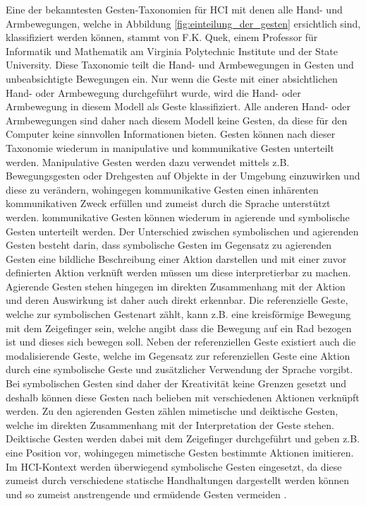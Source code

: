 Eine der bekanntesten Gesten-Taxonomien für HCI mit denen alle Hand- und Armbewegungen, welche in Abbildung \ref{fig:einteilung_der_gesten} ersichtlich sind, klassifiziert werden können, stammt von F.K. Quek, einem  Professor für Informatik und Mathematik am Virginia Polytechnic Institute und der State University. Diese Taxonomie teilt die Hand- und Armbewegungen in Gesten und unbeabsichtigte Bewegungen ein. Nur wenn die Geste mit einer absichtlichen Hand- oder Armbewegung durchgeführt wurde, wird die Hand- oder Armbewegung in diesem Modell als Geste klassifiziert. Alle anderen Hand- oder Armbewegungen sind daher nach diesem Modell keine Gesten, da diese für den Computer keine sinnvollen Informationen bieten. Gesten können nach dieser Taxonomie wiederum in manipulative und kommunikative Gesten unterteilt werden. Manipulative Gesten werden dazu verwendet mittels z.B. Bewegungsgesten oder Drehgesten auf Objekte in der Umgebung einzuwirken und diese zu verändern, wohingegen kommunikative Gesten einen inhärenten kommunikativen Zweck erfüllen und zumeist durch die Sprache unterstützt werden. kommunikative Gesten können wiederum in agierende und symbolische Gesten unterteilt werden. Der Unterschied zwischen symbolischen und agierenden Gesten besteht darin, dass symbolische Gesten im Gegensatz zu agierenden Gesten eine bildliche Beschreibung einer Aktion darstellen und mit einer zuvor definierten Aktion verknüft werden müssen um diese interpretierbar zu machen. Agierende Gesten stehen hingegen im direkten Zusammenhang mit der Aktion und deren Auswirkung ist daher auch direkt erkennbar. Die referenzielle Geste, welche zur symbolischen Gestenart zählt, kann z.B. eine kreisförmige Bewegung mit dem Zeigefinger sein, welche angibt dass die Bewegung auf ein Rad bezogen ist und dieses sich bewegen soll. Neben der referenziellen Geste existiert auch die modalisierende Geste, welche im Gegensatz zur referenziellen Geste eine Aktion durch eine symbolische Geste und zusätzlicher Verwendung der Sprache vorgibt. Bei symbolischen Gesten sind daher der Kreativität keine Grenzen gesetzt und deshalb können diese Gesten nach belieben mit verschiedenen Aktionen verknüpft werden. Zu den agierenden Gesten zählen mimetische und deiktische Gesten, welche im direkten Zusammenhang mit der Interpretation der Geste stehen. Deiktische Gesten werden dabei mit dem Zeigefinger durchgeführt und geben z.B. eine Position vor, wohingegen mimetische Gesten bestimmte Aktionen imitieren. Im HCI-Kontext werden überwiegend symbolische Gesten eingesetzt, da diese zumeist durch verschiedene statische Handhaltungen dargestellt werden können und so zumeist anstrengende und ermüdende Gesten vermeiden \cite[680]{pavlovic_visual_1997}.


